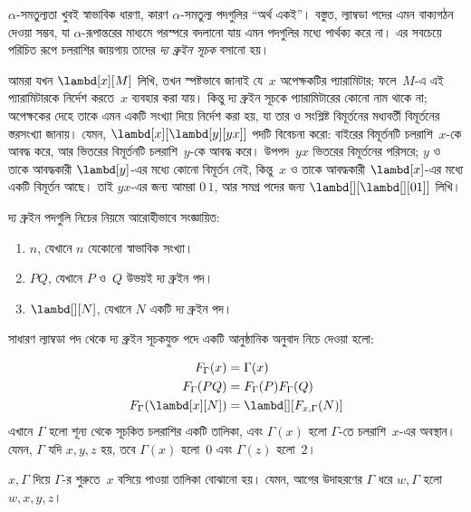 \documentclass[../../../include/open-logic-section]{subfiles}
\begin{document}


$\alpha$-সমতুল্যতা খুবই স্বাভাবিক ধারণা, কারণ $\alpha$-সমতুল্য পদগুলির
``অর্থ একই''। বস্তুত, ল্যাম্বডা পদের এমন বাক্যগঠন দেওয়া সম্ভব, যা
$\alpha$-রূপান্তরের মাধ্যমে পরস্পরে বদলানো যায় এমন পদগুলির মধ্যে পার্থক্য
করে না। এর সবচেয়ে পরিচিত রূপে চলরাশির জায়গায় তাদের
\emph{দ্য ব্রুইন সূচক} বসানো হয়।

আমরা যখন $\lambd[x][M]$ লিখি, তখন স্পষ্টভাবে জানাই যে~$x$ অপেক্ষকটির
প্যারামিটার; ফলে~$M$-এ এই প্যারামিটারকে নির্দেশ করতে~$x$ ব্যবহার করা
যায়। কিন্তু দ্য ব্রুইন সূচকে প্যারামিটারের কোনো নাম থাকে না; অপেক্ষকের
দেহে তাকে এমন একটি সংখ্যা দিয়ে নির্দেশ করা হয়, যা তার ও সংশ্লিষ্ট
বিমূর্তনের মধ্যবর্তী বিমূর্তনের স্তরসংখ্যা জানায়। যেমন,
$\lambd[x][\lambd[y][y x]]$ পদটি বিবেচনা করো: বাইরের বিমূর্তনটি
চলরাশি~$x$-কে আবদ্ধ করে, আর ভিতরের বিমূর্তনটি চলরাশি~$y$-কে আবদ্ধ করে।
উপপদ~$y x$ ভিতরের বিমূর্তনের পরিসরে; $y$ ও তাকে আবদ্ধকারী
$\lambd[y]$-এর মধ্যে কোনো বিমূর্তন নেই, কিন্তু~$x$ ও তাকে আবদ্ধকারী
$\lambd[x]$-এর মধ্যে একটি বিমূর্তন আছে। তাই $y x$-এর জন্য আমরা
$0\, 1$, আর সমগ্র পদের জন্য $\lambd[][\lambd[][01]]$ লিখি।

\begin{defn}
  দ্য ব্রুইন পদগুলি নিচের নিয়মে আরোহীভাবে সংজ্ঞায়িত:
  \begin{enumerate}
  \item $n$, যেখানে $n$ যেকোনো স্বাভাবিক সংখ্যা।
  \item $PQ$, যেখানে $P$ ও~$Q$ উভয়ই দ্য ব্রুইন পদ।
  \item $\lambd[][N]$, যেখানে $N$ একটি দ্য ব্রুইন পদ।
  \end{enumerate}
\end{defn}

সাধারণ ল্যাম্বডা পদ থেকে দ্য ব্রুইন সূচকযুক্ত পদে একটি আনুষ্ঠানিক অনুবাদ
নিচে দেওয়া হলো:
\begin{defn}
  \begin{align*}
    F_\Gamma(x) &= \Gamma(x) \\
    F_\Gamma(PQ) &= F_\Gamma(P)F_\Gamma(Q) \\
    F_\Gamma(\lambd[x][N]) &= \lambd[][F_{x,\Gamma}(N)]
  \end{align*}
  এখানে $\Gamma$ হলো শূন্য থেকে সূচকিত চলরাশির একটি তালিকা, এবং
  $\Gamma(x)$ হলো $\Gamma$-তে চলরাশি~$x$-এর অবস্থান। যেমন, $\Gamma$
  যদি $x,y,z$ হয়, তবে $\Gamma(x)$ হলো~$0$ এবং $\Gamma(z)$ হলো~$2$।

  $x,\Gamma$ দিয়ে $\Gamma$-র শুরুতে~$x$ বসিয়ে পাওয়া তালিকা বোঝানো
  হয়। যেমন, আগের উদাহরণের $\Gamma$ ধরে $w,\Gamma$ হলো $w,x,y,z$।
\end{defn}
\end{document}
